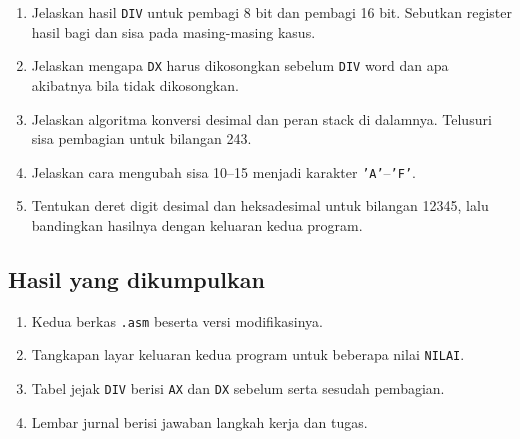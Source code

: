 \begin{enumerate}
    \item Jelaskan hasil \texttt{DIV} untuk pembagi 8 bit dan pembagi
          16 bit. Sebutkan register hasil bagi dan sisa pada
          masing-masing kasus.
    \item Jelaskan mengapa \texttt{DX} harus dikosongkan sebelum
          \texttt{DIV} word dan apa akibatnya bila tidak dikosongkan.
    \item Jelaskan algoritma konversi desimal dan peran stack di
          dalamnya. Telusuri sisa pembagian untuk bilangan 243.
    \item Jelaskan cara mengubah sisa 10--15 menjadi karakter
          \texttt{'A'}--\texttt{'F'}.
    \item Tentukan deret digit desimal dan heksadesimal untuk bilangan
          12345, lalu bandingkan hasilnya dengan keluaran kedua
          program.
\end{enumerate}

\subsection{Hasil yang dikumpulkan}

\begin{enumerate}
    \item Kedua berkas \texttt{.asm} beserta versi modifikasinya.
    \item Tangkapan layar keluaran kedua program untuk beberapa nilai
          \texttt{NILAI}.
    \item Tabel jejak \texttt{DIV} berisi \texttt{AX} dan \texttt{DX}
          sebelum serta sesudah pembagian.
    \item Lembar jurnal berisi jawaban langkah kerja dan tugas.
\end{enumerate}
